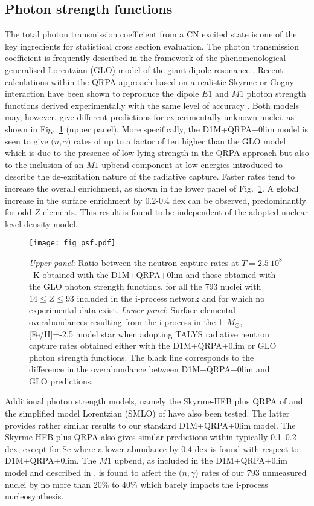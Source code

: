 \documentclass{aa}
\def\Msun{$M_{\odot}$}
\begin{document}
\subsection{Photon strength functions}
\label{sect_psf}
The total photon transmission coefficient from a CN excited state is one of
the key ingredients for statistical cross section evaluation. The photon transmission
coefficient is  frequently described in the framework of the phenomenological
generalised Lorentzian (GLO) model of the giant dipole resonance \citep{Kopecky90,Capote09}.
Recent calculations within the QRPA approach based on a realistic Skyrme
or Gogny interaction have been shown to reproduce
the dipole $E1$ and $M1$ photon strength functions derived experimentally 
with the same level of accuracy \citep{Goriely19}.
Both models may, however, give different predictions for experimentally unknown nuclei, as shown in Fig.~\ref{fig_psf} (upper panel). More specifically, the D1M+QRPA+0lim model \citep{Goriely18a} is seen to give $(n,\gamma$) rates of up to a factor of ten higher than the GLO model \citep{Kopecky90,Capote09} which is due to the presence of low-lying strength in the QRPA approach but also to the inclusion of an $M1$ upbend component at low energies introduced to describe the de-excitation nature of the radiative capture. Faster rates tend to increase the overall enrichment, as shown in the lower panel of Fig.~\ref{fig_psf}. A global increase in the surface enrichment by 0.2-0.4 dex can be observed, predominantly for odd-$Z$ elements. This result is found to be independent of the adopted nuclear level density model.
\begin{figure}
\texttt{[image: fig\_psf.pdf]}
\caption{{\it Upper panel}: Ratio between the neutron capture rates at $T = 2.5~10^8$~K obtained with the D1M+QRPA+0lim \citep{Goriely18a} and those obtained with the GLO \citep{Kopecky90,Capote09} photon strength functions, for all the 793 nuclei with $14 \le Z \le 93$ included in the i-process network and for which no experimental data exist.
{\it Lower panel}: Surface elemental overabundances resulting from the i-process in the 1~\Msun{}, [Fe/H]=-2.5 model star when adopting {\sf TALYS} radiative neutron capture rates obtained either with the D1M+QRPA+0lim or GLO photon strength functions. The black line corresponds to the difference in the overabundance between D1M+QRPA+0lim and GLO predictions.
 }
\label{fig_psf}
\end{figure}
Additional photon strength models, namely the Skyrme-HFB plus QRPA of \citet{Goriely04} and the simplified model Lorentzian (SMLO) of  \citet{Goriely18b} have also been tested. The latter provides rather similar results to our standard D1M+QRPA+0lim model. The Skyrme-HFB plus QRPA also gives similar predictions within typically 0.1--0.2 dex, except for Sc where a lower abundance by 0.4 dex is found with respect to D1M+QRPA+0lim.
The $M1$ upbend, as included in the D1M+QRPA+0lim model and described in \citet{Goriely18a}, is found to affect the $(n,\gamma$) rates of our 793 unmeasured nuclei by no more than 20\% to 40\% which barely impacts the i-process nucleosynthesis.
\end{document}
